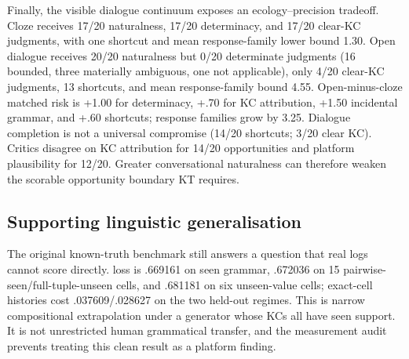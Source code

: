 Finally, the visible dialogue continuum exposes an ecology--precision tradeoff.
Cloze receives 17/20 naturalness, 17/20 determinacy, and 17/20 clear-KC
judgments, with one shortcut and mean response-family lower bound 1.30.  Open
dialogue receives 20/20 naturalness but 0/20 determinate judgments (16 bounded,
three materially ambiguous, one not applicable), only 4/20 clear-KC judgments,
13 shortcuts, and mean response-family bound 4.55.  Open-minus-cloze matched
risk is +1.00 for determinacy, +.70 for KC attribution, +1.50 incidental
grammar, and +.60 shortcuts; response families grow by 3.25.  Dialogue
completion is not a universal compromise (14/20 shortcuts; 3/20 clear KC).
Critics disagree on KC attribution for 14/20 opportunities and platform
plausibility for 12/20.  Greater conversational naturalness can therefore
weaken the scorable opportunity boundary KT requires.



\subsection{Supporting linguistic generalisation}



The original known-truth benchmark still answers a question that real logs
cannot score directly.  \kstar{} loss is .669161 on seen grammar, .672036 on 15
pairwise-seen/full-tuple-unseen cells, and .681181 on six unseen-value cells;
exact-cell histories cost .037609/.028627 on the two held-out regimes.  This is
narrow compositional extrapolation under a generator whose KCs all have seen
support.  It is not unrestricted human grammatical transfer, and the
measurement audit prevents treating this clean result as a platform finding.
